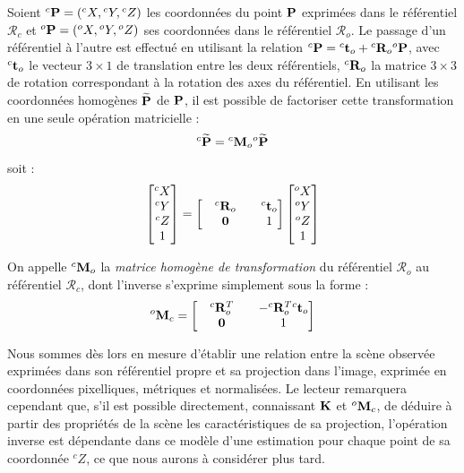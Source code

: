 Soient ${}^c{\bf P} = ({}^cX, {}^cY, {}^cZ)$ les coordonnées du point ${\bf P}$ 
exprimées dans le référentiel $\mathcal R_c$ et ${}^o{\bf P} = ({}^oX, {}^oY, 
{}^oZ)$ ses coordonnées dans le référentiel $\mathcal R_o$. Le passage d'un 
référentiel à l'autre est effectué en utilisant la relation ${}^c{\bf P} = 
{}^c{\bf t}_o + {}^c{\bf R}_o {}^o{\bf P}$, avec ${}^c{\bf t}_o$ le vecteur 
$3\times 1$ de translation entre les deux référentiels, ${}^c{\bf R}_o$ la 
matrice $3\times 3$ de rotation correspondant à la rotation des axes du 
référentiel. En utilisant les coordonnées homogènes $\widetilde {\bf P}$ de 
${\bf P}$, il est possible de factoriser cette transformation en une seule 
opération matricielle :
\begin{equation}
{}^c \widetilde {\bf P} = {}^c {\bf M}_o {}^o \widetilde {\bf P}
\label{intro:eq18}
\end{equation}
soit :
\begin{equation}
\begin{bmatrix}
{}^cX \\ {}^cY \\ {}^cZ \\ 1
\end{bmatrix}
=
\begin{bmatrix}
&  {}^c{\bf R}_o & & {}^c{\bf t}_o \\
& {\bf 0} & & 1
\end{bmatrix}
\begin{bmatrix}
{}^oX \\ {}^oY \\ {}^oZ \\ 1
\end{bmatrix}
\label{intro:eq19}
\end{equation}

On appelle ${}^c{\bf M}_o$ la {\it matrice homogène de transformation} du 
référentiel $\mathcal R_o$ au référentiel $\mathcal R_c$, dont l'inverse 
s'exprime simplement sous la forme :
\begin{equation}
{}^o{\bf M}_c = 
\begin{bmatrix}
&  {}^c{\bf R}_o^T & & -{}^c{\bf R}_o^T {}^c{\bf t}_o \\
& {\bf 0} & & 1
\end{bmatrix}
\label{intro:eq20}
\end{equation}

Nous sommes dès lors en mesure d'établir une relation entre la scène observée 
exprimées dans son référentiel propre et sa projection dans l'image, exprimée 
en coordonnées pixelliques, métriques et normalisées. Le lecteur 
remarquera cependant que, s'il est possible directement, connaissant ${\bf K}$ 
et ${}^o{\bf M}_c$, de déduire à partir des propriétés de la scène les 
caractéristiques de sa projection, l'opération inverse est dépendante dans ce 
modèle d'une estimation pour chaque point de sa coordonnée ${}^cZ$, ce que nous 
aurons à considérer plus tard.

